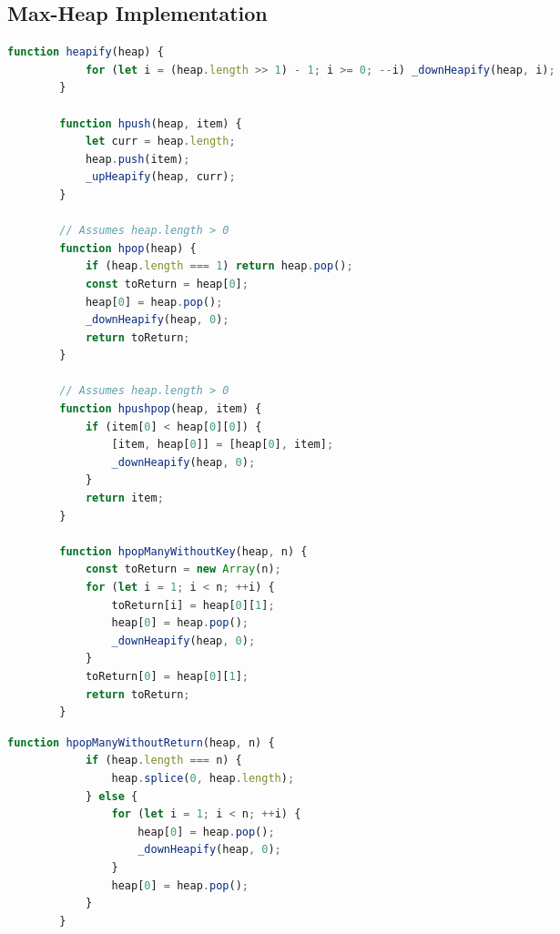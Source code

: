 \subsection{Max-Heap Implementation}%
\label{sec:standard-implementations--javascript--max-heap-impl}



\begin{multicols}{2}

    \begin{lstlisting}[language={Javascript}, caption={
        A simple Javascript \emph{max-heap} implementation.
    }]
        function heapify(heap) {
            for (let i = (heap.length >> 1) - 1; i >= 0; --i) _downHeapify(heap, i);
        }

        function hpush(heap, item) {
            let curr = heap.length;
            heap.push(item);
            _upHeapify(heap, curr);
        }

        // Assumes heap.length > 0
        function hpop(heap) {
            if (heap.length === 1) return heap.pop();
            const toReturn = heap[0];
            heap[0] = heap.pop();
            _downHeapify(heap, 0);
            return toReturn;
        }

        // Assumes heap.length > 0
        function hpushpop(heap, item) {
            if (item[0] < heap[0][0]) {
                [item, heap[0]] = [heap[0], item];
                _downHeapify(heap, 0);
            }
            return item;
        }

        function hpopManyWithoutKey(heap, n) {
            const toReturn = new Array(n);
            for (let i = 1; i < n; ++i) {
                toReturn[i] = heap[0][1];
                heap[0] = heap.pop();
                _downHeapify(heap, 0);
            }
            toReturn[0] = heap[0][1];
            return toReturn;
        }
    \end{lstlisting}

    \columnbreak

    \begin{lstlisting}[language={Javascript}]
        function hpopManyWithoutReturn(heap, n) {
            if (heap.length === n) {
                heap.splice(0, heap.length);
            } else {
                for (let i = 1; i < n; ++i) {
                    heap[0] = heap.pop();
                    _downHeapify(heap, 0);
                }
                heap[0] = heap.pop();
            }
        }   


\end{lstlisting}
\end{multicols}
